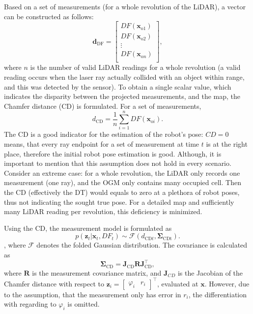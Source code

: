 Based on a set of measurements (for a whole revolution of the LiDAR), a vector can be constructed as follows:
\begin{equation}\label{eq:df-vector}
    \mathbf{d}_{\text{DF}} =
    \begin{bmatrix}
        DF(\mathbf{x}_{\text{o}1}) \\
        DF(\mathbf{x}_{\text{o}2}) \\
        \vdots                     \\
        DF(\mathbf{x}_{\text{o}n}) \\
    \end{bmatrix},
\end{equation}
where $n$ is the number of valid LiDAR readings for a whole revolution
(a valid reading occurs when the laser ray actually collided with an object within range, and this was
detected by the sensor).
To obtain a single scalar value, which indicates the disparity between the projected measurements,
and the map, the Chamfer distance (CD) is formulated. For a set of measurements,
\begin{equation}
    d_{\text{CD}} = \frac{1}{n}\sum_{i=1}^nDF(\mathbf{x}_{\text{o}i}).
\end{equation}
The CD is a good indicator for the estimation of the robot's pose: $CD=0$ means,
that every ray endpoint for a set of measurement at time $t$ is at the right place,
therefore the initial robot pose estimation is good.
Although, it is important to mention that this assumption does not hold in every
scenario. Consider an extreme case: for a whole revolution, the LiDAR only records
one measurement (one ray), and the OGM only contains many occupied cell.
Then the CD (effectively the DT) would equals to zero at a plethora of robot poses, thus not indicating the sought true pose.
For a detailed map and sufficiently many LiDAR reading per revolution, this deficiency is minimized.

Using the CD, the measurement model is formulated as
\begin{equation}
    p(\mathbf{\mathbf{z}}_t | \mathbf{x}_t, DF_t) \sim \mathcal{F}(d_{\text{CD}t},\boldsymbol\Sigma_{\text{CDt}}).
\end{equation},
where $\mathcal{F}$ denotes the folded Gaussian distribution.
The covariance is calculated as
\begin{equation}
    \boldsymbol\Sigma_{\text{CD}} = \mathbf{J}_{\text{CD}}\mathbf{R}\mathbf{J}_{\text{CD}}^{\top},
\end{equation}
where $\mathbf{R}$ is the measurement covariance matrix, and $\mathbf{J}_{CD}$ is the Jacobian of the
Chamfer distance with respect to $\mathbf{z}_i = \begin{bmatrix}\varphi_i&r_i\end{bmatrix}^{\top}$,
evaluated at $\mathbf{x}$. However, due to the assumption, that the measurement only has error
in $r_i$, the differentiation with regarding to $\varphi_i$ is omitted.

